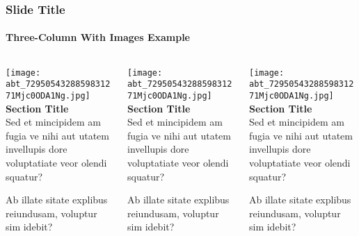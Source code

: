 \documentclass[
aspectratio=169, %
t, %
onlytextwidth, %
10pt, %
]{beamer}
\begin{document}
\begin{frame}
    \frametitle{Slide Title}
    \framesubtitle{Three-Column With Images Example}

    \small %

    \begin{columns}[T] %
        \begin{column}{0.3\linewidth} %
            \texttt{[image: abt\_7295054328859831271Mjc0ODA1Ng.jpg]}\\[3pt]
            \textbf{Section Title}\\			
            Sed et mincipidem am fugia ve nihi aut utatem invellupis dore voluptatiate veor olendi squatur?

            Ab illate sitate explibus reiundusam, voluptur sim idebit?
        \end{column}
        \begin{column}{0.3\linewidth} %
            \texttt{[image: abt\_7295054328859831271Mjc0ODA1Ng.jpg]}\\[3pt]
            \textbf{Section Title}\\			
            Sed et mincipidem am fugia ve nihi aut utatem invellupis dore voluptatiate veor olendi squatur?

            Ab illate sitate explibus reiundusam, voluptur sim idebit?
        \end{column}
        \begin{column}{0.3\linewidth} %
            \texttt{[image: abt\_7295054328859831271Mjc0ODA1Ng.jpg]}\\[3pt]
            \textbf{Section Title}\\			
            Sed et mincipidem am fugia ve nihi aut utatem invellupis dore voluptatiate veor olendi squatur?

            Ab illate sitate explibus reiundusam, voluptur sim idebit?
        \end{column}
    \end{columns}
\end{frame}

\end{document}

